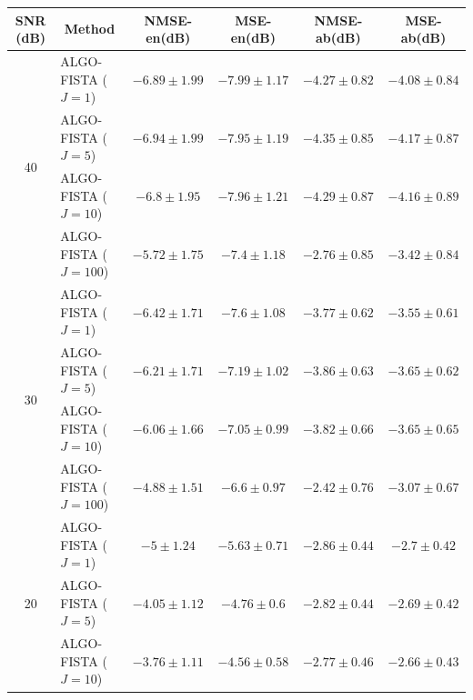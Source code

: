 \newpage

\begin{table}[h]
\centering
\begin{adjustbox}{max width=\textwidth}
\begin{tabular}{|c|l|c|c|c|c|}
\hline
SNR (dB)            & \multicolumn{1}{c|}{Method}   & NMSE-en(dB)         & MSE-en(dB)          & NMSE-ab(dB)         & MSE-ab(dB)          \tabularnewline \hline
\multirow{4}{*}{40} & ALGO-FISTA ($J=1$)            & $-6.89    \pm 1.99$ & $-7.99    \pm 1.17$ & $-4.27    \pm 0.82$ & $-4.08    \pm 0.84$ \tabularnewline
                    & ALGO-FISTA ($J=5$)            & $-6.94    \pm 1.99$ & $-7.95    \pm 1.19$ & $-4.35    \pm 0.85$ & $-4.17    \pm 0.87$ \tabularnewline
                    & ALGO-FISTA ($J=10$)           & $-6.8     \pm 1.95$ & $-7.96    \pm 1.21$ & $-4.29    \pm 0.87$ & $-4.16    \pm 0.89$ \tabularnewline
                    & ALGO-FISTA ($J=100$)          & $-5.72    \pm 1.75$ & $-7.4     \pm 1.18$ & $-2.76    \pm 0.85$ & $-3.42    \pm 0.84$ \tabularnewline \hline
\multirow{4}{*}{30} & ALGO-FISTA ($J=1$)            & $-6.42    \pm 1.71$ & $-7.6     \pm 1.08$ & $-3.77    \pm 0.62$ & $-3.55    \pm 0.61$ \tabularnewline
                    & ALGO-FISTA ($J=5$)            & $-6.21    \pm 1.71$ & $-7.19    \pm 1.02$ & $-3.86    \pm 0.63$ & $-3.65    \pm 0.62$ \tabularnewline
                    & ALGO-FISTA ($J=10$)           & $-6.06    \pm 1.66$ & $-7.05    \pm 0.99$ & $-3.82    \pm 0.66$ & $-3.65    \pm 0.65$ \tabularnewline
                    & ALGO-FISTA ($J=100$)          & $-4.88    \pm 1.51$ & $-6.6     \pm 0.97$ & $-2.42    \pm 0.76$ & $-3.07    \pm 0.67$ \tabularnewline \hline
\multirow{4}{*}{20} & ALGO-FISTA ($J=1$)            & $-5       \pm 1.24$ & $-5.63    \pm 0.71$ & $-2.86    \pm 0.44$ & $-2.7     \pm 0.42$ \tabularnewline
                    & ALGO-FISTA ($J=5$)            & $-4.05    \pm 1.12$ & $-4.76    \pm 0.6$  & $-2.82    \pm 0.44$ & $-2.69    \pm 0.42$ \tabularnewline
                    & ALGO-FISTA ($J=10$)           & $-3.76    \pm 1.11$ & $-4.56    \pm 0.58$ & $-2.77    \pm 0.46$ & $-2.66    \pm 0.43$ \tabularnewline

\end{tabular}
\end{adjustbox}
\end{table}
